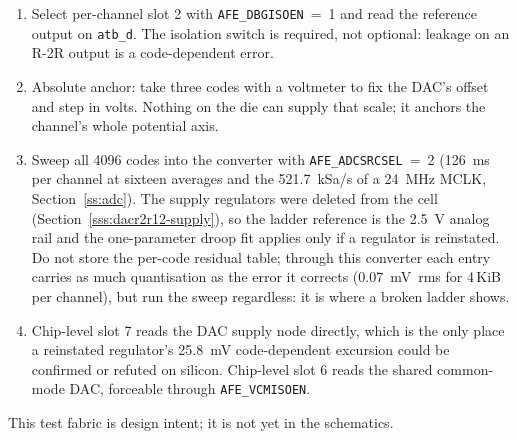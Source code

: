 \begin{enumerate}[nosep]
\item Select per-channel slot 2 with \texttt{AFE\_DBGISOEN}~=~1 and read the
  reference output on \texttt{atb\_d}. The isolation switch is required, not
  optional: leakage on an R-2R output is a code-dependent error.
\item Absolute anchor: take three codes with a voltmeter to fix the DAC's
  offset and step in volts. Nothing on the die can supply that scale; it
  anchors the channel's whole potential axis.
\item Sweep all 4096 codes into the converter with
  \texttt{AFE\_ADCSRCSEL}~=~2 (\SI{126}{\milli\second} per channel at sixteen
  averages and the \SI{521.7}{kSa/s} of a \SI{24}{\mega\hertz} MCLK,
  Section~\ref{ss:adc}). The supply regulators
  were deleted from the cell (Section~\ref{sss:dacr2r12-supply}), so the ladder
  reference is the \SI{2.5}{\volt} analog rail and the one-parameter droop fit
  applies only if a regulator is reinstated. Do not store the per-code
  residual table; through this converter each entry carries as much
  quantisation as the error it corrects (\SI{0.07}{\milli\volt}~rms for
  4\,KiB per channel), but run the sweep regardless: it is where a broken
  ladder shows.
\item Chip-level slot 7 reads the DAC supply node directly, which is the only
  place a reinstated regulator's \SI{25.8}{\milli\volt} code-dependent
  excursion could be confirmed or refuted on silicon. Chip-level slot 6 reads
  the shared common-mode DAC, forceable
  through \texttt{AFE\_VCMISOEN}.
\end{enumerate}
This test fabric is design intent; it is not yet in the schematics.
